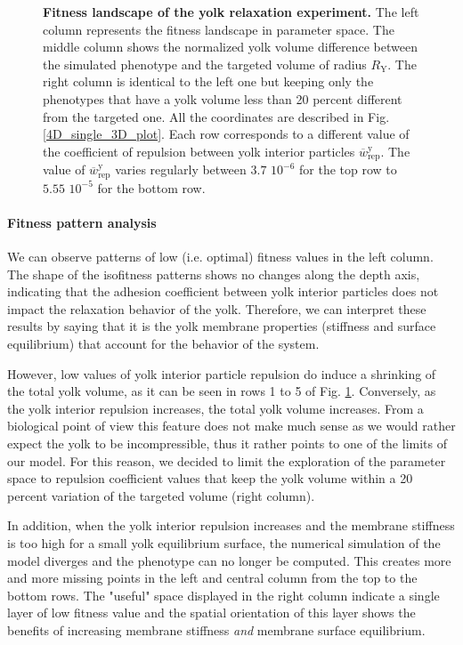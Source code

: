 \begin{figure}
\begin{center}
\end{center}
\caption{\textbf{Fitness landscape of the yolk relaxation experiment.}   The left column represents the fitness landscape in parameter space. The middle column shows the normalized yolk volume difference between the simulated phenotype and the targeted volume of radius $R_{\mathrm{Y}}$. The right column is identical to the left one but keeping only the phenotypes that have a yolk volume less than 20 percent different from the targeted one. All the coordinates are described in Fig. \ref{4D_single_3D_plot}. Each row corresponds to a different value of the coefficient of repulsion between yolk interior particles $ \overline{w}^{\mathrm{y}}_{\mathrm{rep}} $. The value of $ \overline{w}^{\mathrm{y}}_{\mathrm{rep}} $ varies regularly between $3.7$ $10^{-6}$ for the top row to $5.55$ $10^{-5}$ for the bottom row.}
\label{4D_fusion_vertical}
\end{figure}

\paragraph{Fitness pattern analysis}


We can observe patterns of low (i.e. optimal) fitness values in the left column. The shape of the isofitness patterns shows no changes along the depth axis, indicating that the adhesion coefficient between yolk interior particles does not impact the relaxation behavior of the yolk. Therefore, we can interpret these results by saying that it is the yolk membrane properties (stiffness and surface equilibrium) that account for the behavior of the system.

However, low values of yolk interior particle repulsion do induce a shrinking of the total yolk volume, as it can be seen in rows 1 to 5 of Fig. \ref{4D_fusion_vertical}. Conversely, as the yolk interior repulsion increases, the total yolk volume increases. From a biological point of view this feature does not make much sense as we would rather expect the yolk to be incompressible, thus it rather points to one of the limits of our model. For this reason, we decided to limit the exploration of the parameter space to repulsion coefficient values that keep the yolk volume within a 20 percent variation of the targeted volume (right column).

In addition, when the yolk interior repulsion increases and the membrane stiffness is too high for a small yolk equilibrium surface, the numerical simulation of the model diverges and the phenotype can no longer be computed. This creates more and more missing points in the left and central column from the top to the bottom rows. The "useful" space displayed in the right column indicate a single layer of low fitness value and the spatial orientation of this layer shows the benefits of increasing membrane stiffness \textit{and} membrane surface equilibrium.

